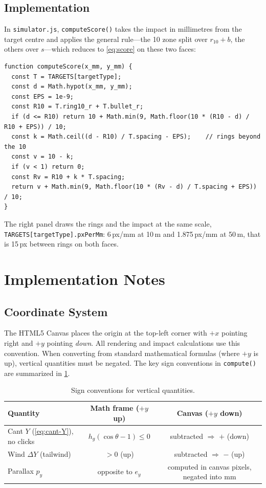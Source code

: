 \documentclass[11pt]{article}
\newcommand{\code}[1]{\texttt{#1}}
\newcommand{\file}[1]{\texttt{#1}}
\begin{document}
\subsection{Implementation}
In \file{simulator.js}, \code{computeScore()} takes the impact in
millimetres from the target centre and applies the general rule---the
10 zone split over $r_{10} + b$, the others over $s$---which reduces to
\cref{eq:score} on these two faces:
\begin{lstlisting}
function computeScore(x_mm, y_mm) {
  const T = TARGETS[targetType];
  const d = Math.hypot(x_mm, y_mm);
  const EPS = 1e-9;
  const R10 = T.ring10_r + T.bullet_r;
  if (d <= R10) return 10 + Math.min(9, Math.floor(10 * (R10 - d) / R10 + EPS)) / 10;
  const k = Math.ceil((d - R10) / T.spacing - EPS);    // rings beyond the 10
  const v = 10 - k;
  if (v < 1) return 0;
  const Rv = R10 + k * T.spacing;
  return v + Math.min(9, Math.floor(10 * (Rv - d) / T.spacing + EPS)) / 10;
}
\end{lstlisting}
The right panel draws the rings and the impact at the same scale,
\code{TARGETS[targetType].pxPerMm}: 6\,px/mm at 10\,m and
1.875\,px/mm at 50\,m, that is 15\,px between rings on both faces.

\section{Implementation Notes}\label{sec:implementation}

\subsection{Coordinate System}\label{sec:coords}
The HTML5 Canvas places the origin at the top-left corner with
$+x$ pointing right and $+y$ pointing \emph{down}.  All rendering
and impact calculations use this convention.  When converting from
standard mathematical formulas (where $+y$ is up), vertical
quantities must be negated.  The key sign conventions in
\code{compute()} are summarized in \cref{tab:signs}.

\begin{table}[H]
\centering\small
\begin{tabular}{@{}lcc@{}}
\toprule
\textbf{Quantity} & \textbf{Math frame} ($+y$ up) & \textbf{Canvas} ($+y$ down) \\
\midrule
Cant $Y$ (\cref{eq:cant-Y}), no clicks & $h_g(\cos\theta - 1) \leq 0$ & subtracted $\Rightarrow$ $+$ (down) \\
Wind $\Delta Y$ (tailwind) & $>0$ (up) & subtracted $\Rightarrow$ $-$ (up) \\
Parallax $p_y$ & opposite to $e_y$ & computed in canvas pixels, negated into mm \\
\bottomrule
\end{tabular}
\caption{Sign conventions for vertical quantities.}\label{tab:signs}
\end{table}
\end{document}
